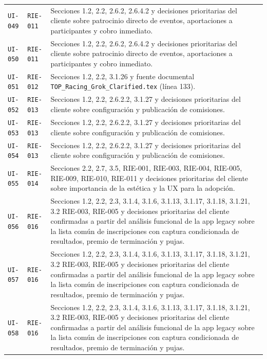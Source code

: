\documentclass[10pt,letterpaper]{article}
\begin{document}
\begin{landscape}
\begin{longtable}{P{2.7cm}P{2.6cm}P{15.7cm}}
\texttt{UI-049} & \texttt{RIE-011} & Secciones 1.2, 2.2, 2.6.2, 2.6.4.2 y decisiones prioritarias del cliente sobre patrocinio directo de eventos, aportaciones a participantes y cobro inmediato.\\
\texttt{UI-050} & \texttt{RIE-011} & Secciones 1.2, 2.2, 2.6.2, 2.6.4.2 y decisiones prioritarias del cliente sobre patrocinio directo de eventos, aportaciones a participantes y cobro inmediato.\\
\texttt{UI-051} & \texttt{RIE-012} & Secciones 1.2, 2.2, 3.1.26 y fuente documental \texttt{TOP\_Racing\_Grok\_Clarified.tex} (línea 133).\\
\texttt{UI-052} & \texttt{RIE-013} & Secciones 1.2, 2.2, 2.6.2.2, 3.1.27 y decisiones prioritarias del cliente sobre configuración y publicación de comisiones.\\
\texttt{UI-053} & \texttt{RIE-013} & Secciones 1.2, 2.2, 2.6.2.2, 3.1.27 y decisiones prioritarias del cliente sobre configuración y publicación de comisiones.\\
\texttt{UI-054} & \texttt{RIE-013} & Secciones 1.2, 2.2, 2.6.2.2, 3.1.27 y decisiones prioritarias del cliente sobre configuración y publicación de comisiones.\\
\texttt{UI-055} & \texttt{RIE-014} & Secciones 2.2, 2.7, 3.5, RIE-001, RIE-003, RIE-004, RIE-005, RIE-009, RIE-010, RIE-011 y decisiones prioritarias del cliente sobre importancia de la estética y la UX para la adopción.\\
\texttt{UI-056} & \texttt{RIE-016} & Secciones 1.2, 2.2, 2.3, 3.1.4, 3.1.6, 3.1.13, 3.1.17, 3.1.18, 3.1.21, 3.2 RIE-003, RIE-005 y decisiones prioritarias del cliente confirmadas a partir del análisis funcional de la app legacy sobre la lista común de inscripciones con captura condicionada de resultados, premio de terminación y pujas.\\
\texttt{UI-057} & \texttt{RIE-016} & Secciones 1.2, 2.2, 2.3, 3.1.4, 3.1.6, 3.1.13, 3.1.17, 3.1.18, 3.1.21, 3.2 RIE-003, RIE-005 y decisiones prioritarias del cliente confirmadas a partir del análisis funcional de la app legacy sobre la lista común de inscripciones con captura condicionada de resultados, premio de terminación y pujas.\\
\texttt{UI-058} & \texttt{RIE-016} & Secciones 1.2, 2.2, 2.3, 3.1.4, 3.1.6, 3.1.13, 3.1.17, 3.1.18, 3.1.21, 3.2 RIE-003, RIE-005 y decisiones prioritarias del cliente confirmadas a partir del análisis funcional de la app legacy sobre la lista común de inscripciones con captura condicionada de resultados, premio de terminación y pujas.\\

\end{longtable}
\end{landscape}
\end{document}
